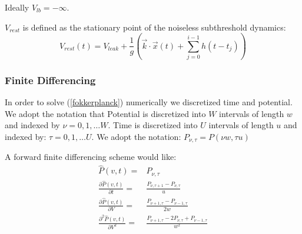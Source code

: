 \documentclass[10pt]{article}
\begin{document}
Ideally $V_{lb} = -\infty $.

$V_{rest}$ is defined as the stationary point of the noiseless
subthreshold dynamics:
\begin{equation}
    V_{rest}(t) = V_{leak} + \frac{1}{g}(\vec{k} \cdot \vec{x}(t) +
    \sum_{j=0}^{i-1}h(t-t_j))
\end{equation}

%

\subsubsection{Finite Differencing}

In order to solve (\ref{fokkerplanck}) numerically we discretized time
and potential. We adopt the notation that Potential is discretized
into $W$ intervals of length $w$ and indexed
by $\nu= 0,1, \dots W $.  Time is discretized  into $U$ intervals of
length $u$ and indexed by: $\tau= 0,1, \dots U $.
We adopt the notation: $P_{\nu,\tau} = P(\nu w,\tau u)$

A forward finite differencing scheme would like:
\begin{eqnarray}
    \hat{P}(v,t) =& P_{\nu,\tau}\\
%
\frac{\partial \hat{P}(v,t)}{\partial t} =& \frac{P_{\nu,\tau +1 } -
    P_{\nu,\tau}}{u} \\
%
    \frac{\partial \hat{P}(v,t)}{\partial V} =& 
    \frac{P_{\nu +1,\tau } -
    P_{\nu - 1,\tau } }
    {2w} \\ 
%
    \frac{\partial^2 \hat{P}(v,t)}{\partial V^2} =& 
    \frac{P_{\nu+1,\tau} - 2 P_{\nu,\tau} + P_{\nu-1,\tau}}
    {w^2} 
\end{eqnarray}
\end{document}
